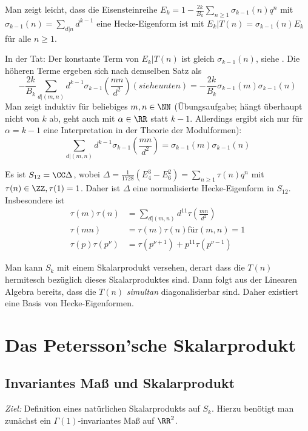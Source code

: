 \begin{beme}
\item Man zeigt \glqq{}leicht\grqq{}, dass die Eisensteinreihe $E_k = 1 - \frac{2k}{B_k} \sum_{n \geq 1} \sigma_{k-1} (n) q^n$ mit $\sigma_{k-1} (n) = \sum_{d \vert n} d^{k-1}$ eine Hecke-Eigenform ist mit $E_k | T(n) = \sigma_{k-1}(n) E_k$ für alle $n \geq 1$.

In der Tat: Der konstante Term von $E_k | T(n)$ ist gleich $\sigma_{k-1}(n)$, siehe . Die höheren Terme ergeben sich nach demselben Satz als 
\[
- \frac{2k}{B_k} \sum_{d \vert (m,n)} d^{k-1} \sigma_{k-1} (\frac{mn}{d^2}) (siehe unten) = - \frac{2k}{B_k} \sigma_{k-1}(m) \sigma_{k-1} (n)
\]
Man zeigt induktiv für beliebiges $m,n \in \NN$ (Übungsaufgabe; hängt überhaupt nicht von $k$ ab, geht auch mit $\alpha \in \RR$ statt $k-1$. Allerdings ergibt sich nur für $\alpha = k-1$ eine Interpretation in der Theorie der Modulformen):
\[
\sum_{d \vert (m,n)} d^{k-1} \sigma_{k-1} (\frac{mn}{d^2}) = \sigma_{k-1}(m) \sigma_{k-1} (n)
\]
\item Es ist $S_{12} = \CC \Delta$, wobei $\Delta = \frac {1}{1728} (E_4^3 - E_6^2) = \sum_{n \geq 1} \tau(n) q^n$ mit $\tau (n) \in \ZZ, \tau(1) = 1$. Daher ist $\Delta$ eine normalisierte Hecke-Eigenform in $S_{12}$. Insbesondere ist
\begin{align*}
\tau(m) \tau(n) &= \sum_{d \vert (m,n)} d^{11} \tau (\frac {mn}{d^2} )\\
\tau(mn) &= \tau(m) \tau(n) \mathrm{für} (m,n) = 1\\
\tau(p) \tau(p^\nu) &= \tau(p^{\nu+1}) + p^{11} \tau(p^{\nu-1})
\end{align*}
\item Man kann $S_k$ mit einem Skalarprodukt versehen, derart dass die $T(n)$ hermitesch bezüglich dieses Skalarproduktes sind. Dann folgt aus der Linearen Algebra bereits, dass die $T(n)$ \emph{simultan} diagonalisierbar sind. Daher existiert eine Basis von Hecke-Eigenformen.
\end{beme}

\chapter{Das Petersson'sche Skalarprodukt}
\section{Invariantes Maß und Skalarprodukt}

\emph{Ziel:} Definition eines \glqq{}natürlichen\grqq{} Skalarprodukts auf $S_k$. Hierzu benötigt man zunächst ein $\Gamma(1)$-invariantes Maß auf $\RR^2$.

